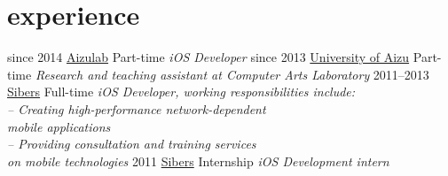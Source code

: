 \documentclass[]{friggeri-cv}
\begin{document}
\section{experience}

\begin{entrylist}
  \entry
    {since 2014}
    {\href{http://www.aizulab.com/}{Aizulab}}
    {Part-time}
    {\emph{iOS Developer}}
  \entry
    {since 2013}
    {\href{www.u-aizu.ac.jp/}{University of Aizu}}
    {Part-time}
    {\emph{Research and teaching assistant at Computer Arts Laboratory}}
  \entry
    {2011–2013}
    {\href{http://www.sibers.com/}{Sibers}}
    {Full-time}
    {\emph{iOS Developer, working responsibilities include:\\
    			– Creating high-performance network-dependent\\
			   mobile applications\\
			– Providing consultation and training services\\
			   on mobile technologies}}
  \entry
    {2011}
    {\href{http://www.sibers.com/}{Sibers}}
    {Internship}
    {\emph{iOS Development intern}}
\end{entrylist}
\end{document}
